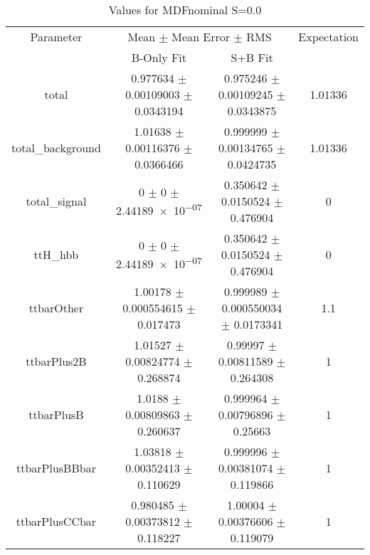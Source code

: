 \begin{table}
\centering
\caption{Values for MDFnominal S=0.0}
\begin{tabular}{cccc}
\toprule
Parameter & \multicolumn{2}{c}{Mean $\pm$ Mean Error $\pm$ RMS} & Expectation\\
 & B-Only Fit & S+B Fit & \\
\midrule
total & \num{0.977634} $\pm$ \num{0.00109003} $\pm$ \num{0.0343194} & \num{0.975246} $\pm$ \num{0.00109245} $\pm$ \num{0.0343875} & \num{1.01336}\\
total\_background & \num{1.01638} $\pm$ \num{0.00116376} $\pm$ \num{0.0366466} & \num{0.999999} $\pm$ \num{0.00134765} $\pm$ \num{0.0424735} & \num{1.01336}\\
total\_signal & \num{0} $\pm$ \num{0} $\pm$ \num{2.44189e-07} & \num{0.350642} $\pm$ \num{0.0150524} $\pm$ \num{0.476904} & \num{0}\\
ttH\_hbb & \num{0} $\pm$ \num{0} $\pm$ \num{2.44189e-07} & \num{0.350642} $\pm$ \num{0.0150524} $\pm$ \num{0.476904} & \num{0}\\
ttbarOther & \num{1.00178} $\pm$ \num{0.000554615} $\pm$ \num{0.017473} & \num{0.999989} $\pm$ \num{0.000550034} $\pm$ \num{0.0173341} & \num{1.1}\\
ttbarPlus2B & \num{1.01527} $\pm$ \num{0.00824774} $\pm$ \num{0.268874} & \num{0.99997} $\pm$ \num{0.00811589} $\pm$ \num{0.264308} & \num{1}\\
ttbarPlusB & \num{1.0188} $\pm$ \num{0.00809863} $\pm$ \num{0.260637} & \num{0.999964} $\pm$ \num{0.00796896} $\pm$ \num{0.25663} & \num{1}\\
ttbarPlusBBbar & \num{1.03818} $\pm$ \num{0.00352413} $\pm$ \num{0.110629} & \num{0.999996} $\pm$ \num{0.00381074} $\pm$ \num{0.119866} & \num{1}\\
ttbarPlusCCbar & \num{0.980485} $\pm$ \num{0.00373812} $\pm$ \num{0.118227} & \num{1.00004} $\pm$ \num{0.00376606} $\pm$ \num{0.119079} & \num{1}\\
\bottomrule
\end{tabular}
\end{table}